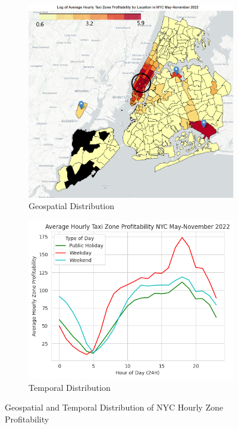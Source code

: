 \documentclass[11pt]{article}
\begin{document}
\begin{figure}[h]
\centering
\begin{subfigure}{.5\textwidth}
  \centering
  \includegraphics[width=.95\linewidth]{plots/log_zone_prof_map_edit.png}
  \caption{Geospatial Distribution}
  \label{1a}
\end{subfigure}%
\begin{subfigure}{.5\textwidth}
  \centering
  \includegraphics[width=1\linewidth]{plots/temporal_zone_profitability.png}
  \caption{Temporal Distribution}
  \label{1b}
\end{subfigure}
\setlength{\belowcaptionskip}{-10pt}
\caption{Geospatial and Temporal Distribution of NYC Hourly Zone Profitability}
\label{1}
\end{figure}
\end{document}
